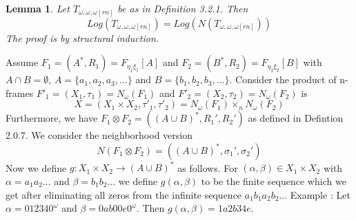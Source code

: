 \documentclass[12pt, a4paper]{scrartcl}
\newtheorem{lemma}[definition]{Lemma}
\begin{document}
\begin{lemma}
    Let $T_{\omega,\omega,\omega[rn]}$ be as in Definition 3.2.1. Then 
    $$Log(T_{\omega,\omega,\omega[rn]}) = Log(N(T_{\omega,\omega,\omega[rn]}))$$ \newline
    The proof is by structural induction.

    
\end{lemma}

    Assume $F_1 = (A^*,R_1) = F_{\eta_1 \xi_1}[A]$ and $F_2 = (B^*,R_2) = F_{\eta_2 \xi_2}[B]$ 
    with $A \cap B = \emptyset$, $A = \{a_1,a_2,a_3,...\}$ and $B = \{b_1,b_2,b_3,...\}$. 
    Consider the product of n-frames $F'_1 = (X_1, \tau_1) = N_\omega(F_1)$ and $F'_2 = (X_2, \tau_2) = N_\omega(F_2)$ is 
    $$X = (X_1 \times X_2, \tau'_1, \tau'_2) = N_\omega(F_1) \times_n N_\omega(F_2)$$ \newline
    Furthermore, we have $F_1 \otimes F_2 = ((A \cup B)^*, R_1', R_2')$ as defined in Defintion 2.0.7.
    We consider the neighborhood version $$N(F_1 \otimes F_2) = ((A \cup B)^*, \sigma_1', \sigma_2')$$ \newline
    Now we define $g : X_1 \times X_2 \rightarrow (A \cup B)^*$ as follows. For $(\alpha, \beta) \in X_1 \times X_2$ with $\alpha = a_1a_2...$ and $\beta = b_1b_2...$
    we define $g(\alpha,\beta)$ to be the finite sequence which we get after eliminating all zeros from the infinite sequence
    $a_1b_1a_2b_2...$ \newline \newline
    Example : Let $\alpha = 012340^\omega$  and $\beta = 0ab00e0^\omega$. Then $g(\alpha, \beta) = 1a2b34e$.
\end{document}
